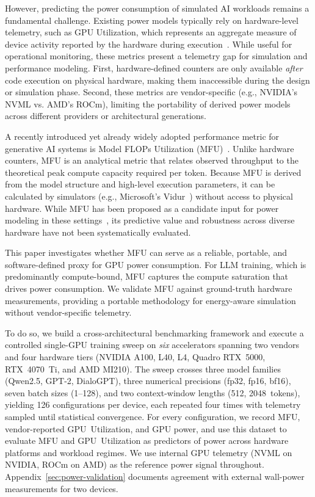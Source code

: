 \documentclass[10pt,conference,letterpaper]{IEEEtran}
\begin{document}
However, predicting the power consumption of simulated AI workloads remains a fundamental challenge.
Existing power models typically rely on hardware-level telemetry, such as GPU Utilization, which represents an aggregate measure of device activity reported by the hardware during execution~\cite{antarctica-2025, bridges-2016}.
While useful for operational monitoring, these metrics present a telemetry gap for simulation and performance modeling.
First, hardware-defined counters are only available \emph{after} code execution on physical hardware, making them inaccessible during the design or simulation phase.
Second, these metrics are vendor-specific (e.g., NVIDIA's NVML vs. AMD's ROCm), limiting the portability of derived power models across different providers or architectural generations.

A recently introduced yet already widely adopted performance metric for generative AI systems is Model FLOPs Utilization (MFU)~\cite{chowdhery-2023}.
Unlike hardware counters, MFU is an analytical metric that relates observed throughput to the theoretical peak compute capacity required per token.
Because MFU is derived from the model structure and high-level execution parameters, it can be calculated by simulators (e.g., Microsoft's Vidur~\cite{agrawal-2025}) without access to physical hardware.
While MFU has been proposed as a candidate input for power modeling in these settings~\cite{ozcan-2025}, its predictive value and robustness across diverse hardware have not been systematically evaluated.

This paper investigates whether MFU can serve as a reliable, portable, and software-defined proxy for GPU power consumption.
For LLM training, which is predominantly compute-bound, MFU captures the compute saturation that drives power consumption.
We validate MFU against ground-truth hardware measurements, providing a portable methodology for energy-aware simulation without vendor-specific telemetry.

To do so, we build a cross-architectural benchmarking framework and execute a controlled single-GPU training sweep on \emph{six} accelerators spanning two vendors and four hardware tiers (NVIDIA A100, L40, L4, Quadro RTX~5000, RTX~4070~Ti, and AMD MI210).
The sweep crosses three model families (Qwen2.5, GPT-2, DialoGPT), three numerical precisions (fp32, fp16, bf16), seven batch sizes (1--128), and two context-window lengths (512, 2048~tokens), yielding 126 configurations per device, each repeated four times with telemetry sampled until statistical convergence.
For every configuration, we record MFU, vendor-reported GPU~Utilization, and GPU power, and use this dataset to evaluate MFU and GPU~Utilization as predictors of power across hardware platforms and workload regimes.
We use internal GPU telemetry (NVML on NVIDIA, ROCm on AMD) as the reference power signal throughout.
Appendix~\ref{sec:power-validation} documents agreement with external wall-power measurements for two devices.
\end{document}
